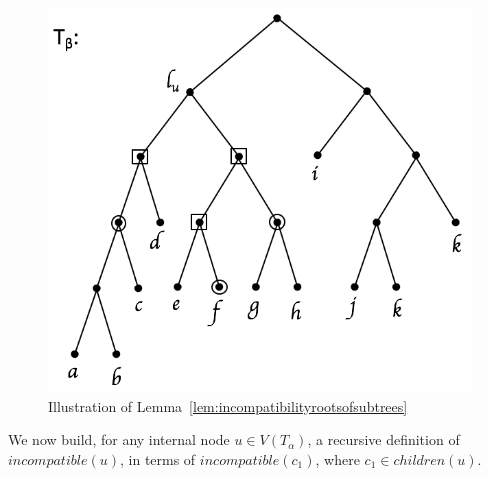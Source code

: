 \documentclass{article}
\begin{document}
    \begin{figure}[h]
        \includegraphics[scale=0.5]{rootsofsubtrees}
        \centering
        \caption{Illustration of Lemma~\ref{lem:incompatibilityrootsofsubtrees}}
        \label{fig:rootsofsubtrees}
    \end{figure}

    We now build, for any internal node $u \in V(T_\alpha)$, a recursive definition of $incompatible(u)$, in terms of $incompatible(c_1)$, where $c_1 \in children(u)$.
    \newline
\end{document}
